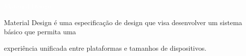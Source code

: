 

\LARGE
\noindent\colorbox{materialBlue}
{\parbox[c][25pt][c]{\textwidth}{\hspace{15pt}\textcolor{white}{Material Design}}} %

\large
\vspace*{10pt}

\textcolor{materialBlue}{Material Design} é uma especificação de design que visa
desenvolver um sistema básico que permita uma

\vspace*{10pt}

experiência unificada entre plataformas e tamanhos de
dispositivos.

\vspace*{10pt}
